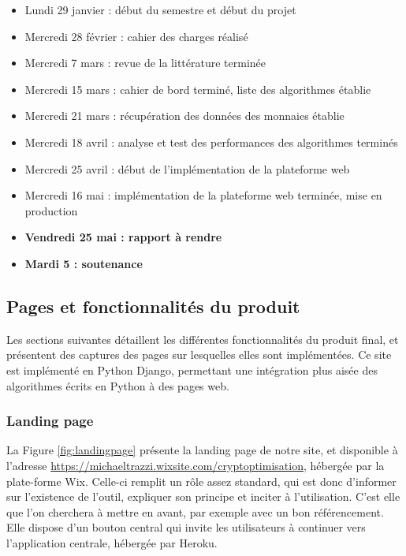 \documentclass[a4paper, 10pt]{article}
\begin{document}
\begin{itemize}
    \item Lundi 29 janvier : début du semestre et début du projet
    \item Mercredi 28 février : cahier des charges réalisé
    \item Mercredi 7 mars : revue de la littérature terminée
    \item Mercredi 15 mars : cahier de bord terminé, liste des algorithmes établie
    \item Mercredi 21 mars : récupération des données des monnaies établie
    \item Mercredi 18 avril : analyse et test des performances des algorithmes terminés
    \item Mercredi 25 avril : début de l'implémentation de la plateforme web
    \item Mercredi 16 mai : implémentation de la plateforme web terminée, mise en production
    \item \textbf{Vendredi 25 mai : rapport à rendre}
    \item \textbf{Mardi 5 : soutenance}
\end{itemize}

\subsection{Pages et fonctionnalités du produit}
\label{sec:developpement_pages}

Les sections suivantes détaillent les différentes fonctionnalités du produit final, et présentent des captures des pages sur lesquelles elles sont implémentées. Ce site est implémenté en Python Django, permettant une intégration plus aisée des algorithmes écrits en Python à des pages web.

\subsubsection{Landing page}
\label{sec:developpement_pages_landing}

La Figure \ref{fig:landingpage} présente la landing page de notre site, et disponible à l'adresse \url{https://michaeltrazzi.wixsite.com/cryptoptimisation}, hébergée par la plate-forme Wix. Celle-ci remplit un rôle assez standard, qui est donc d'informer sur l'existence de l'outil, expliquer son principe et inciter à l'utilisation. C'est elle que l'on cherchera à mettre en avant, par exemple avec un bon référencement. Elle dispose d'un bouton central qui invite les utilisateurs à continuer vers l'application centrale, hébergée par Heroku.
\end{document}
